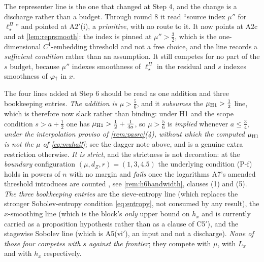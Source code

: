 The representer line is the one that changed at Step 4, and the change is a discharge rather than a
budget. Through round 8 it read ``source index $\mu''$ for $\ell^\Pi_\star$'' and pointed at
A2$'$(i), a \emph{primitive}, with no route to it. It now points at A2c and at
\cref{lem:reprsmooth}: the index is pinned at $\mu''>\tfrac32$, which is the one-dimensional
$C^{1}$-embedding threshold and not a free choice, and the line records a \emph{sufficient condition}
rather than an assumption. It still competes for no part of the $s$ budget, because $\mu''$ indexes
smoothness of $\ell^\Pi_\star$ in the residual and $s$ indexes smoothness of $\varphi_{\dagger}$ in $x$.

The four lines added at Step 6 should be read as one addition and three bookkeeping entries.
\emph{The addition is $\mu>\tfrac56$}, and it \emph{subsumes} the $\mu_{\text{\textup{H1}}}>\tfrac12$ line,
which is therefore now slack rather than binding: under H1 and the scope condition $s>a+\tfrac12$ one has
$\mu_{\text{\textup{H1}}}>\tfrac12+\tfrac1{4a}$, so $\mu>\tfrac56$ is \emph{implied} whenever
$a\le\tfrac34$, \emph{under the interpolation proviso of \cref{rem:pasrc}\textup{(4)}, without which the
computed $\mu_{\text{\textup{H1}}}$ is not the $\mu$ of \eqref{eq:muhalf}}; see the dagger note above, and is a
genuine extra restriction otherwise. \emph{It is strict}, and the strictness is not decoration: at the
\emph{boundary} configuration $(\mu,d_Z,r)=(1,3,4.5)$ the underlying condition (P-f) holds in powers of
$n$ with no margin and \emph{fails} once the logarithms A7's amended threshold introduces are counted
, see \cref{rem:h6bandwidth}, clauses (1) and (5). \emph{The three bookkeeping entries} are the
sieve-entropy line (which replaces the stronger Sobolev-entropy condition \eqref{eq:entropy}, not
consumed by any result), the $x$-smoothing line (which is the block's \emph{only} upper bound on $h_x$
and is currently carried as a proposition hypothesis rather than as a clause of C5$'$), and the
stagewise Sobolev line (which is A5(vi$'$), an input and not a discharge). \emph{None of those four
competes with $s$ against the frontier}; they compete with $\mu$, with $L_x$ and with $h_x$
respectively.

